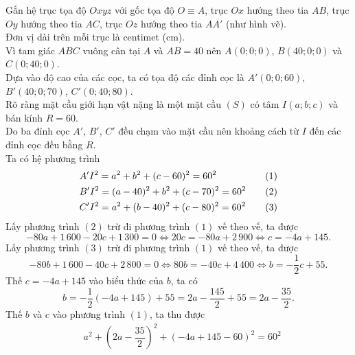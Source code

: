 \begin{ex}
{\begin{center}
		\end{center}
		Gắn hệ trục tọa độ $Oxyz$ với gốc tọa độ $O \equiv A$, trục $Ox$ hướng theo tia $AB$, trục $Oy$ hướng theo tia $AC$, trục $Oz$ hướng theo tia $AA'$ (như hình vẽ).\\
		Đơn vị dài trên mỗi trục là centimet (cm).\\
		Vì tam giác $ABC$ vuông cân tại $A$ và $AB=40$ nên $A(0;0;0)$, $B(40;0;0)$ và $C(0;40;0)$.\\
		Dựa vào độ cao của các cọc, ta có tọa độ các đỉnh cọc là $A'(0;0;60)$, $B'(40;0;70)$, $C'(0;40;80)$.\\
		Rõ ràng mặt cầu giới hạn vật nặng là một mặt cầu $(S)$ có tâm $I(a; b; c)$ và bán kính $R = 60$.\\
		Do ba đỉnh cọc $A'$, $B'$, $C'$ đều chạm vào mặt cầu nên khoảng cách từ $I$ đến các đỉnh cọc đều bằng $R$.\\ 
		Ta có hệ phương trình
		\begin{align}
			& A'I^2 = a^2 + b^2 + (c-60)^2 = 60^2 \quad &(1) \notag \\
			& B'I^2 = (a-40)^2 + b^2 + (c-70)^2 = 60^2 \quad &(2) \notag \\
			& C'I^2 = a^2 + (b-40)^2 + (c-80)^2 = 60^2 \quad &(3) \notag
		\end{align}
		Lấy phương trình $(2)$ trừ đi phương trình $(1)$ vế theo vế, ta được
		\[ -80a + 1\,600 - 20c + 1\,300 = 0 \Leftrightarrow 20c = -80a + 2\,900 \Leftrightarrow c = -4a + 145. \]
		Lấy phương trình $(3)$ trừ đi phương trình $(1)$ vế theo vế, ta được
		\[ -80b + 1\,600 - 40c + 2\,800 = 0 \Leftrightarrow 80b = -40c + 4\,400 \Leftrightarrow b = -\dfrac{1}{2}c + 55. \]
		Thế $c = -4a + 145$ vào biểu thức của $b$, ta có
		\[ b = -\dfrac{1}{2}(-4a + 145) + 55 = 2a - \dfrac{145}{2} + 55 = 2a - \dfrac{35}{2}. \]
		Thế $b$ và $c$ vào phương trình $(1)$, ta thu được
		\allowdisplaybreaks
		\begin{align*}
			& a^2 + \left(2a - \dfrac{35}{2}\right)^2 + (-4a + 145 - 60)^2 = 60^2 \\

\end{align*}}
\end{ex}
